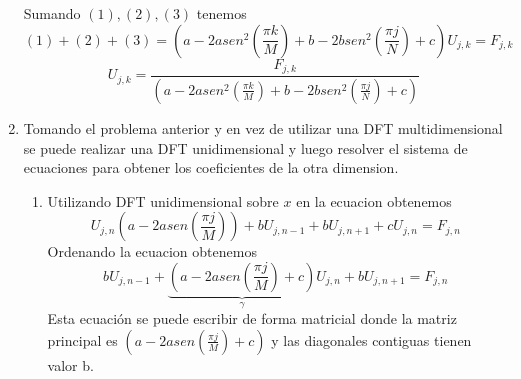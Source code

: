 \documentclass[spanish]{article}
\begin{document}
\begin{enumerate}
    Sumando $(1),(2),(3)$ tenemos
    \begin{equation}
        (1)+(2)+(3) = \left(  a - 2a sen^2\left( \frac{\pi k}{M} \right) +  b - 2b sen^2\left( \frac{\pi j}{N} \right) + c \right) U_{j,k}  = F_{j,k}
    \end{equation}
    \begin{equation}
         U_{j,k}  = \frac{F_{j,k}}{\left(  a - 2a sen^2\left( \frac{\pi k}{M} \right) +  b - 2b sen^2\left( \frac{\pi j}{N} \right) + c \right)}
    \end{equation}
    
    \item Tomando el problema anterior y en vez de utilizar una DFT multidimensional se puede realizar una DFT unidimensional y luego resolver el sistema de ecuaciones para obtener los coeficientes de la otra dimension.
    
    \begin{enumerate}
        \item Utilizando DFT unidimensional sobre $x$ en la ecuacion obtenemos
        \begin{equation}
            U_{j,n} \left(a - 2 a sen\left( \frac{\pi j}{M} \right)  \right) + b U_{j,n-1} + b U_{j,n+1} + c U_{j,n} = F_{j,n}
         \end{equation}
         Ordenando la ecuacion obtenemos
         \begin{equation}
             b U_{j,n-1} + \underbrace{\left(a - 2 a sen\left( \frac{\pi j}{M} \right) +c  \right)}_{\gamma}  U_{j,n} + b U_{j,n+1} = F_{j,n} 
         \end{equation}
        Esta ecuación se puede escribir de forma matricial donde la matriz principal es $\left(a - 2 a sen\left( \frac{\pi j}{M} \right) +c  \right)$ y las diagonales contiguas tienen valor b.
        

\end{enumerate}
\end{enumerate}
\end{document}

